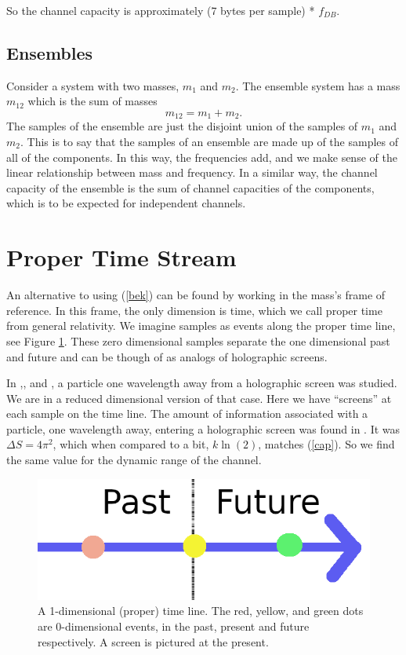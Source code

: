 \documentclass[12pt,a4paper]{article}
\begin{document}
So the channel capacity is approximately (7 bytes per sample) * $f_{DB}$.
\subsection{Ensembles}
Consider a system with two masses, $m_1$ and $m_2$.  The ensemble system has a mass $m_{12}$ which is the sum of masses
\[
m_{12} = m_1 + m_2.
\]
The samples of the ensemble are just the disjoint union of the samples of $m_1$ and $m_2$.   This is to say that the samples of an ensemble are made up of the samples of all of the components.  In this way, the frequencies add, and we make sense of the linear relationship between mass and frequency.  In a similar way, the channel capacity of the ensemble is the sum of channel capacities of the components, which is to be expected for independent channels.

\section{Proper Time Stream}
An alternative to using (\ref{bek}) can be found by working in the mass's frame of reference. In this frame, the only dimension is time, which we call proper time from general relativity.  We imagine samples as events along the proper time line, see Figure \ref{timeline}.  These zero dimensional samples separate the one dimensional past and future and can be though of as analogs of holographic screens.  

In \cite{thrust},\cite{entropic}, and \cite{bekenstein}, a particle one wavelength away from a holographic screen was studied.  We are in a reduced dimensional version of that case.  Here we have ``screens'' at each sample on the time line.  The amount of information associated with a particle, one wavelength away, entering a holographic screen was found in \cite{thrust}.  It was $\Delta S = 4\pi^2$, which when compared to a bit, $k \ln(2)$, matches (\ref{cap}).  So we find the same value for the dynamic range of the channel.

\begin{figure}[H]
\centering
\includegraphics[scale=0.23]{time_line.png}
\caption{A 1-dimensional (proper) time line.  The red, yellow, and green dots are 0-dimensional events, in the past, present and future respectively.  A screen is pictured at the present.}
\label{timeline}
\end{figure}
\end{document}
